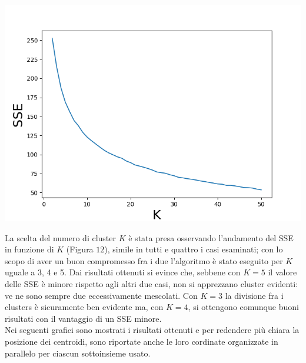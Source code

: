 \documentclass[a4paper,9pt]{article}
\begin{document}
\begin{center}
\includegraphics[scale=0.6]{SSEsub1.png}
\end{center}

La scelta del numero di cluster $K$ è stata presa osservando l'andamento del SSE in funzione di $K$ (Figura $12$), simile in tutti e quattro i casi esaminati; con lo scopo di aver un buon compromesso fra i due l'algoritmo è stato eseguito per $K$ uguale a 3, 4 e 5. Dai risultati ottenuti si evince che, sebbene con $K=5$ il valore delle SSE è minore rispetto agli altri due casi, non si apprezzano cluster evidenti: ve ne sono sempre due eccessivamente mescolati. Con $K=3$ la divisione fra i clusters è sicuramente ben evidente ma, con $K=4$, si ottengono comunque buoni risultati con il vantaggio di un SSE minore. \\
Nei seguenti grafici sono mostrati i risultati ottenuti e per redendere più chiara la posizione dei centroidi, sono riportate anche le loro cordinate organizzate in parallelo per ciascun sottoinsieme usato.
\end{document}
